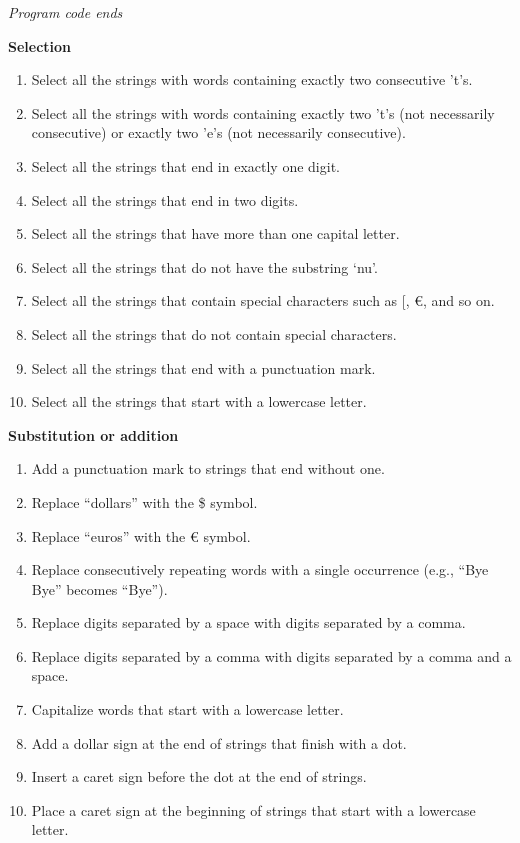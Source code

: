 \emph{Program code ends}

\textbf{Selection}

\begin{enumerate}
\def\labelenumi{\arabic{enumi}.}
\tightlist
\item
  Select all the strings with words containing exactly two consecutive
  't's.
\item
  Select all the strings with words containing exactly two 't's (not
  necessarily consecutive) or exactly two 'e's (not necessarily
  consecutive).
\item
  Select all the strings that end in exactly one digit.
\item
  Select all the strings that end in two digits.
\item
  Select all the strings that have more than one capital letter.
\item
  Select all the strings that do not have the substring `nu'.
\item
  Select all the strings that contain special characters such as {[}, €,
  and so on.
\item
  Select all the strings that do not contain special characters.
\item
  Select all the strings that end with a punctuation mark.
\item
  Select all the strings that start with a lowercase letter.
\end{enumerate}

\textbf{Substitution or addition}

\begin{enumerate}
\def\labelenumi{\arabic{enumi}.}
\tightlist
\item
  Add a punctuation mark to strings that end without one.
\item
  Replace ``dollars'' with the \$ symbol.
\item
  Replace ``euros'' with the € symbol.
\item
  Replace consecutively repeating words with a single occurrence (e.g.,
  ``Bye Bye'' becomes ``Bye'').
\item
  Replace digits separated by a space with digits separated by a comma.
\item
  Replace digits separated by a comma with digits separated by a comma
  and a space.
\item
  Capitalize words that start with a lowercase letter.
\item
  Add a dollar sign at the end of strings that finish with a dot.
\item
  Insert a caret sign before the dot at the end of strings.
\item
  Place a caret sign at the beginning of strings that start with a
  lowercase letter.
\end{enumerate}

